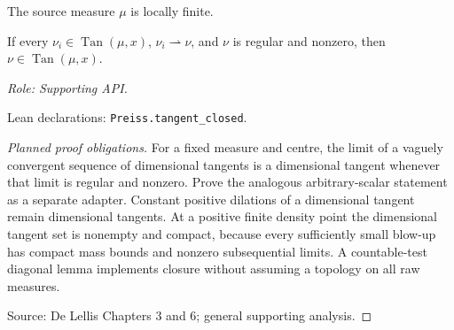 \begin{lemma}
\label{lem:tangent-closed}




The source measure $\mu$ is locally finite.




If every $\nu_i\in\operatorname{Tan}(\mu,x)$, $\nu_i\rightharpoonup\nu$, and $\nu$ is regular and nonzero, then $\nu\in\operatorname{Tan}(\mu,x)$.
\par\emph{Role: Supporting API.}
\par Lean declarations: \texttt{Preiss.tangent\_closed}.
\end{lemma}
\begin{proof}[Planned proof obligations]

For a fixed measure and centre, the limit of a vaguely convergent sequence of
dimensional tangents is a dimensional tangent whenever that limit is regular
and nonzero. Prove the analogous arbitrary-scalar statement as a separate
adapter. Constant positive dilations of a dimensional tangent remain dimensional
tangents. At a positive finite density point the dimensional tangent set is
nonempty and compact, because every sufficiently small blow-up has compact
mass bounds and nonzero subsequential limits. A countable-test diagonal lemma
implements closure without assuming a topology on all raw measures.
\par Source: De Lellis Chapters 3 and 6; general supporting analysis.
\end{proof}

